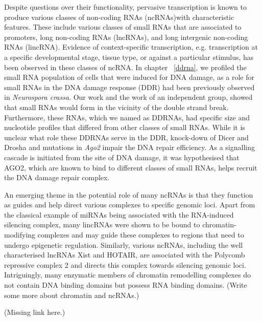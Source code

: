 Despite questions over their functionality, pervasive transcription is known to produce various classes of non-coding RNAs (ncRNAs)with characteristic features. These include various classes of small RNAs that are associated to promoters\cite{pmid19920851}, long non-coding RNAs (lncRNAs)\cite{pmid24290031}, and long intergenic non-coding RNAs (lincRNA)\cite{pmid23818866}. Evidence of context-specific transcription, e.g. transcription at a specific developmental stage, tissue type, or against a particular stimulus, has been observed in these classes of ncRNA. In chapter ~\ref{ddrna}, we profiled the small RNA population of cells that were induced for DNA damage, as a role for small RNAs in the DNA damage response (DDR) had been previously observed in \textit{Neurospora crassa}\cite{pmid19444217}. Our work and the work of an independent group, showed that small RNAs would form in the vicinity of the double strand break\cite{francia2012site,pmid22445173}. Furthermore, these RNAs, which we named as DDRNAs, had specific size and nucleotide profiles that differed from other classes of small RNAs. While it is unclear what role these DDRNAs serve in the DDR, knock-down of Dicer and Drosha\cite{francia2012site} and mutations in \textit{Ago2}\cite{pmid22445173} impair the DNA repair efficiency. As a signalling cascade is initiated from the site of DNA damage\cite{pmid19847258}, it was hypothesised that AGO2, which are known to bind to different classes of small RNAs, helps recruit the DNA damage repair complex\cite{pmid22445173}.

An emerging theme in the potential role of many ncRNAs is that they function as guides and help direct various complexes to specific genomic loci. Apart from the classical example of miRNAs being associated with the RNA-induced silencing complex, many lincRNAs were shown to be bound to chromatin-modifying complexes and may guide these complexes to regions that need to undergo epigenetic regulation\cite{pmid19571010}. Similarly, various ncRNAs, including the well characterised lncRNAs Xist and HOTAIR, are associated with the Polycomb repressive complex 2 and directs this complex towards silencing genomic loci\cite{pmid23431328}. Intriguingly, many enzymatic members of chromatin remodelling complexes do not contain DNA binding domains but possess RNA binding domains. (Write some more about chromatin and ncRNAs.)

(Missing link here.)

